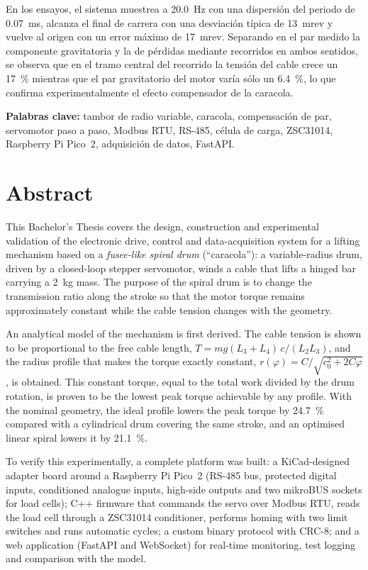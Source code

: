 En los ensayos, el sistema muestrea a \SI{20.0}{\hertz} con una dispersión del periodo de
\SI{0.07}{\milli\second}, alcanza el final de carrera con una desviación típica de
\SI{13}{mrev} y vuelve al origen con un error máximo de \SI{17}{mrev}. Separando
en el par medido la componente gravitatoria y la de pérdidas mediante recorridos en ambos
sentidos, se observa que en el tramo central del recorrido la tensión del cable crece un
\SI{17}{\percent} mientras que el par gravitatorio del motor varía sólo un \SI{6.4}{\percent}, lo
que confirma experimentalmente el efecto compensador de la caracola.

\vspace{1em}
\noindent\textbf{Palabras clave:} tambor de radio variable, caracola, compensación de par,
servomotor paso a paso, Modbus RTU, RS-485, célula de carga, ZSC31014, Raspberry Pi Pico~2,
adquisición de datos, FastAPI.

\cleardoublepage
\chapter*{Abstract}
\thispagestyle{plain}

This Bachelor's Thesis covers the design, construction and experimental validation of the
electronic drive, control and data-acquisition system for a lifting mechanism based on a
\emph{fusee-like spiral drum} (``caracola''): a variable-radius drum, driven by a closed-loop
stepper servomotor, winds a cable that lifts a hinged bar carrying a \SI{2}{\kilo\gram} mass. The
purpose of the spiral drum is to change the transmission ratio along the stroke so that the motor
torque remains approximately constant while the cable tension changes with the geometry.

An analytical model of the mechanism is first derived. The cable tension is shown to be
proportional to the free cable length, $T = mg(L_3+L_4)\,c/(L_2L_3)$, and the radius profile that
makes the torque exactly constant, $r(\varphi)=C/\sqrt{c_0^2+2C\varphi}$, is obtained. This constant
torque, equal to the total work divided by the drum rotation, is proven to be the lowest peak
torque achievable by any profile. With the nominal geometry, the ideal profile lowers the peak
torque by \SI{24.7}{\percent} compared with a cylindrical drum covering the same stroke, and an
optimised linear spiral lowers it by \SI{21.1}{\percent}.

To verify this experimentally, a complete platform was built: a KiCad-designed adapter board
around a Raspberry Pi Pico~2 (RS-485 bus, protected digital inputs, conditioned analogue inputs,
high-side outputs and two mikroBUS sockets for load cells); C++ firmware that commands the servo
over Modbus RTU, reads the load cell through a ZSC31014 conditioner, performs homing with two limit
switches and runs automatic cycles; a custom binary protocol with CRC-8; and a web application
(FastAPI and WebSocket) for real-time monitoring, test logging and comparison with the model.


